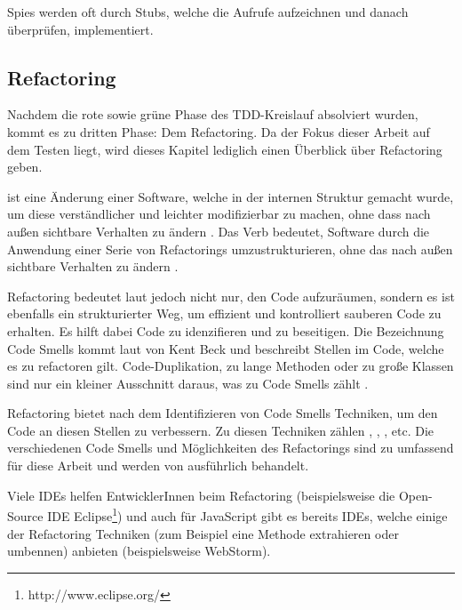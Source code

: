 Spies werden oft durch Stubs, welche die Aufrufe aufzeichnen und danach überprüfen, implementiert.

\subsection{Refactoring}
Nachdem die rote sowie grüne Phase des TDD-Kreislauf absolviert wurden, kommt es zu dritten Phase: Dem Refactoring. Da der Fokus dieser Arbeit auf dem Testen liegt, wird dieses Kapitel lediglich einen Überblick über Refactoring geben.

 ist eine Änderung einer Software, welche in der internen Struktur gemacht wurde, um diese verständlicher und leichter modifizierbar zu machen, ohne dass nach außen sichtbare Verhalten zu ändern \autocite[53]{Fowler:2012}. Das Verb  bedeutet, Software durch die Anwendung einer Serie von Refactorings umzustrukturieren, ohne das nach außen sichtbare Verhalten zu ändern \autocite[54]{Fowler:2012}.

Refactoring bedeutet laut \cite{Fowler:2012} jedoch nicht nur, den Code aufzuräumen, sondern es ist ebenfalls ein strukturierter Weg, um effizient und kontrolliert sauberen Code zu erhalten. Es hilft dabei Code  zu idenzifieren und zu beseitigen. Die Bezeichnung Code Smells kommt laut \cite{Fowler:2012} von Kent Beck und beschreibt Stellen im Code, welche es zu refactoren gilt. Code-Duplikation, zu lange Methoden oder zu große Klassen sind nur ein kleiner Ausschnitt daraus, was zu Code Smells zählt \autocite[67-88]{Fowler:2012}.

Refactoring bietet nach dem Identifizieren von Code Smells Techniken, um den Code an diesen Stellen zu verbessern. Zu diesen Techniken zählen , , , etc. Die verschiedenen Code Smells und Möglichkeiten des Refactorings sind zu umfassend für diese Arbeit und werden von \cite{Fowler:2012} ausführlich behandelt.

Viele IDEs helfen EntwicklerInnen beim Refactoring (beispielsweise die Open-Source IDE Eclipse\footnote{http://www.eclipse.org/}) und auch für JavaScript gibt es bereits IDEs, welche einige der Refactoring Techniken (zum Beispiel eine Methode extrahieren oder umbennen) anbieten (beispielsweise WebStorm).

